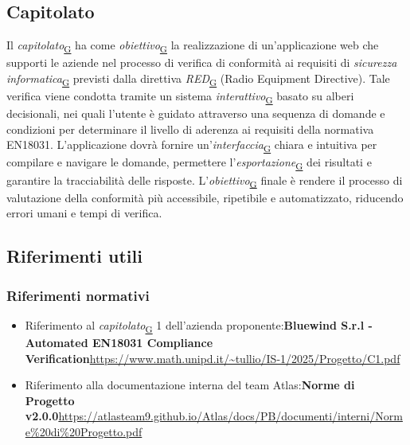 \documentclass[a4paper,12pt]{article}
\begin{document}
{    \subsection{Capitolato}{
        Il \textit{capitolato}\textsubscript{\href{https://atlasteam9.github.io/Atlas/glossario.html\#Capitolato}{G}} ha come \textit{obiettivo}\textsubscript{\href{https://atlasteam9.github.io/Atlas/glossario.html\#Obiettivo}{G}} la realizzazione di un'applicazione web che supporti le aziende nel processo di verifica di conformità ai requisiti di
        \textit{sicurezza informatica}\textsubscript{\href{https://atlasteam9.github.io/Atlas/glossario.html\#Sicurezzainformatica}{G}} previsti dalla direttiva \textit{RED}\textsubscript{\href{https://atlasteam9.github.io/Atlas/glossario.html\#RED}{G}} (Radio Equipment Directive). Tale verifica viene condotta tramite un sistema \textit{interattivo}\textsubscript{\href{https://atlasteam9.github.io/Atlas/glossario.html\#Interattivo}{G}} basato su alberi decisionali, nei quali l'utente è guidato attraverso una sequenza di domande e condizioni per determinare il livello di aderenza ai requisiti della normativa EN18031. L'applicazione dovrà fornire un'\textit{interfaccia}\textsubscript{\href{https://atlasteam9.github.io/Atlas/glossario.html\#Interfaccia}{G}} chiara e intuitiva per compilare e navigare le domande, permettere l'\textit{esportazione}\textsubscript{\href{https://atlasteam9.github.io/Atlas/glossario.html\#Esportazione}{G}} dei risultati e garantire la tracciabilità delle risposte. L'\textit{obiettivo}\textsubscript{\href{https://atlasteam9.github.io/Atlas/glossario.html\#Obiettivo}{G}} finale è rendere il processo di valutazione della conformità più accessibile, ripetibile e automatizzato, riducendo errori umani e tempi di verifica.
    }
    \newpage
    \subsection{Riferimenti utili}{
        \subsubsection{Riferimenti normativi}{
            \begin{itemize}
                \item Riferimento al \textit{capitolato}\textsubscript{\href{https://atlasteam9.github.io/Atlas/glossario.html\#Capitolato}{G}} 1 dell'azienda proponente:\newline \textbf{Bluewind S.r.l - Automated EN18031 Compliance Verification}\newline \url{https://www.math.unipd.it/~tullio/IS-1/2025/Progetto/C1.pdf}
                \item Riferimento alla documentazione interna del team Atlas:\newline \textbf{Norme di Progetto v2.0.0}\newline\url{https://atlasteam9.github.io/Atlas/docs/PB/documenti/interni/Norme%20di%20Progetto.pdf}
            \end{itemize}
        }
}}
\end{document}
